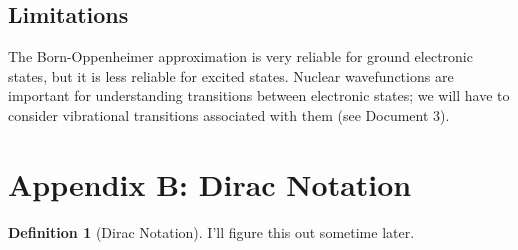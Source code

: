 \documentclass[a4paper]{tufte-handout}
\theoremstyle{definition}
\newtheorem{definition}{Definition}
\begin{document}
\subsection{Limitations}

The Born-Oppenheimer approximation is very reliable for ground electronic 
states, but it is less reliable for excited states. Nuclear wavefunctions
are important for understanding transitions between electronic states; we will have to consider vibrational transitions associated with them (see Document 3).

\section{Appendix B: Dirac Notation}

\begin{definition}[Dirac Notation]
  I'll figure this out sometime later.
  
\end{definition}



\end{document}
